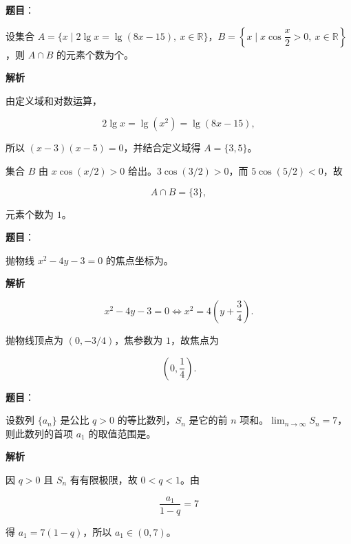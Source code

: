 \begin{answer}

\textbf{题目}：

设集合 $A=\{x\mid 2\lg x=\lg(8x-15),\ x\in\mathbb R\}$，$B=\left\{x\mid x\cos\dfrac{x}{2}>0,\ x\in\mathbb R\right\}$，则 $A\cap B$ 的元素个数为\gkblank{}个。

\textbf{解析}

由定义域和对数运算，

\nopagebreak[4]
\[
2\lg x=\lg(x^2)=\lg(8x-15),
\]

所以 $(x-3)(x-5)=0$，并结合定义域得 $A=\{3,5\}$。

集合 $B$ 由 $x\cos(x/2)>0$ 给出。$3\cos(3/2)>0$，而 $5\cos(5/2)<0$，故

\nopagebreak[4]
\[
A\cap B=\{3\},
\]

元素个数为 $1$。


\end{answer}
\begin{answer}

\textbf{题目}：

抛物线 $x^2-4y-3=0$ 的焦点坐标为\gkblank{}。

\textbf{解析}

\nopagebreak[4]
\[
x^2-4y-3=0
\Longleftrightarrow x^2=4\left(y+\frac34\right).
\]

抛物线顶点为 $(0,-3/4)$，焦参数为 $1$，故焦点为

\nopagebreak[4]
\[
\left(0,\frac14\right).
\]


\end{answer}
\begin{answer}

\textbf{题目}：

设数列 $\{a_n\}$ 是公比 $q>0$ 的等比数列，$S_n$ 是它的前 $n$ 项和。$\displaystyle\lim_{n\to\infty}S_n=7$，则此数列的首项 $a_1$ 的取值范围是\gkblank{}。

\textbf{解析}

因 $q>0$ 且 $S_n$ 有有限极限，故 $0<q<1$。由

\nopagebreak[4]
\[
\frac{a_1}{1-q}=7
\]

得 $a_1=7(1-q)$，所以 $a_1\in(0,7)$。


\end{answer}
